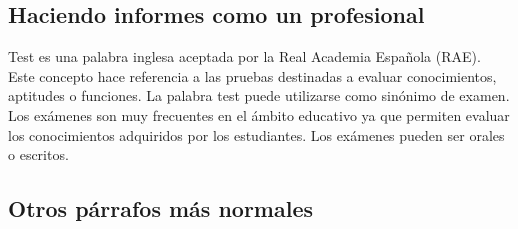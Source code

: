 	\subsection{Haciendo informes como un profesional}
	
	
		Test es una palabra inglesa aceptada por la Real Academia Española (RAE). Este concepto hace referencia a las pruebas destinadas a evaluar conocimientos, aptitudes o funciones. La palabra test puede utilizarse como sinónimo de examen. Los exámenes son muy frecuentes en el ámbito educativo ya que permiten evaluar los conocimientos adquiridos por los estudiantes. Los exámenes pueden ser orales o escritos.
		
		\newp \lipsum[115]
		
		\newp \lipsum[2]
		
		
		\lipsum[115]
		\vspace{\defaultnewlinesize}
		\lipsum[4]
		
	\subsection{Otros párrafos más normales}
	
		\lipsum[7]
		
		\newp \lipsum[2]
		
		
